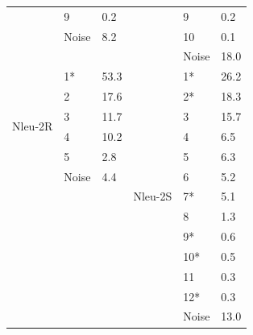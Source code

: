 \begin{table}[]
\begin{tabular}{c|ll||c|ll}
                          & 9       & 0.2         &                           & 9       & 0.2         \\
                          & Noise   & 8.2         &                           & 10      & 0.1         \\
                          &         &             &                           & Noise   & 18.0        \\
\hline
\multirow{6}{*}{Nleu-2R}  & 1*      & 53.3        & \multirow{13}{*}{Nleu-2S} & 1*      & 26.2        \\
                          & 2       & 17.6        &                           & 2*      & 18.3        \\
                          & 3       & 11.7        &                           & 3       & 15.7        \\
                          & 4       & 10.2        &                           & 4       & 6.5         \\
                          & 5       & 2.8         &                           & 5       & 6.3         \\
                          & Noise   & 4.4         &                           & 6       & 5.2         \\
                          &         &             &                           & 7*      & 5.1         \\
                          &         &             &                           & 8       & 1.3         \\
                          &         &             &                           & 9*      & 0.6         \\
                          &         &             &                           & 10*     & 0.5         \\
                          &         &             &                           & 11      & 0.3         \\
                          &         &             &                           & 12*     & 0.3         \\
                          &         &             &                           & Noise   & 13.0       
\end{tabular}%
\end{table}

